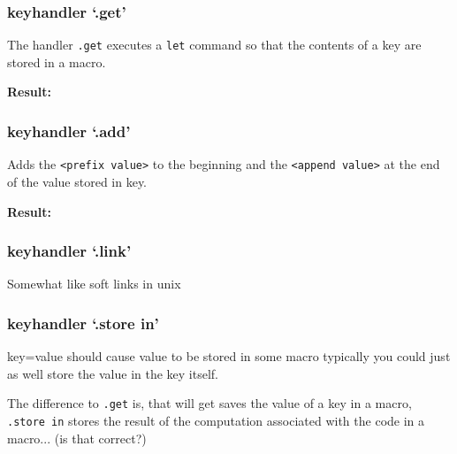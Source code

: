\documentclass{scrartcl}
\let\inlatex\lstinline
\newenvironment{result}
    {\noindent\ignorespaces\textbf{Result:}\newline}
    {\par\noindent\ignorespacesafterend}
\begin{document}
\subsubsection{keyhandler `.get'}

The handler \inlatex{.get} executes a \inlatex{let} command so that the contents 
of a key are stored in a macro. 

\begin{latex}
\mymacro
\end{latex}

\begin{result}
\mymacro
\end{result}

\subsubsection{keyhandler `.add'}

Adds the \inlatex{<prefix value>} to the beginning and the 
\inlatex{<append value>} at the end of the value stored in key.

\begin{latex}
\end{latex}

\begin{result}
\end{result}


\subsubsection{keyhandler `.link'}

Somewhat like soft links in unix


\subsubsection{keyhandler `.store in'}

key=value should cause value to be stored in some macro
typically you could just as well store the value in the key itself.

The difference to \inlatex{.get} is, that will get saves the value of a key
in a macro, \inlatex{.store in} stores the result of the computation associated 
with the code in a macro... (is that correct?)
\end{document}
